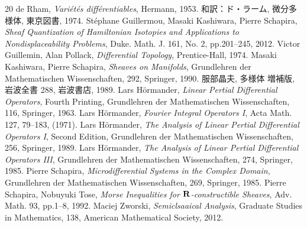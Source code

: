 \begin{thebibliography}{20} 
  de Rham, \textit{Vari\'et\'es diff\'erentiables}, Hermann, 1953.
  和訳：ド・ラーム, 微分多様体, 東京図書, 1974.
   St\'ephane Guillermou, 
  Masaki Kashiwara, Pierre Schapira, 
  \textit{Sheaf Quantization of Hamiltonian Isotopies and Applications to Nondisplaceability Problems}, 
  Duke. Math. J. 161, No. 2, pp.201--245, 2012.  
   Victor Guillemin, Alan Pollack, 
    \textit{Differential Topology}, 
    Prentice-Hall, 1974.
   Masaki Kashiwara, Pierre Schapira, 
    \textit{Sheaves on Manifolds}, 
    Grundlehren der Mathematischen Wissenschaften, 292, Springer, 1990.
   服部晶夫, 多様体 増補版, 岩波全書 288, 岩波書店, 1989.
   Lars H\"ormander, 
  \textit{Linear Pertial Differential Operators}, Fourth Printing, 
  Grundlehren der Mathematischen Wissenschaften, 116, Springer, 1963.
   Lars H\"ormander, 
  \textit{Fourier Integral Operators I}, 
  Acta Math. 127, 79--183, (1971).
   Lars H\"ormander, 
  \textit{The Analysis of Linear Pertial Differential Operators I}, Second Edition,
  Grundlehren der Mathematischen Wissenschaften, 256, Springer, 1989.
   Lars H\"ormander, 
  \textit{The Analysis of Linear Pertial Differential Operators III}, 
  Grundlehren der Mathematischen Wissenschaften, 274, Springer, 1985.
   Pierre Schapira, 
    \textit{Microdifferential Systems in the Complex Domain}, 
    Grundlehren der Mathematischen Wissenschaften, 269, 
    Springer, 1985.
     Pierre Schapira, Nobuyuki Tose, 
    \textit{Morse Inequalities for \(\mathbf{R}\)-constructible Sheaves}, 
    Adv. Math. 93, pp.1--8, 1992. 
     Maciej Zworski,
    \textit{Semiclsaaical Analysis}, 
    Graduate Studies in Mathematics, 138, 
    American Mathematical Society, 
    2012. 
\end{thebibliography}







